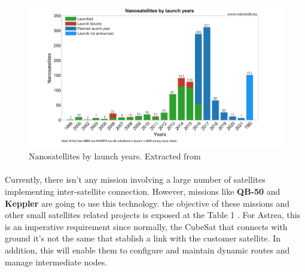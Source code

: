 \documentclass[12pt]{scrartcl}
\begin{document}
\begin{figure}[h!]
\centering
\includegraphics[scale=0.47]{images/launches.png}
\caption{Nanosatellites by launch years. Extracted from \cite{nanosats}}
\label{launches}
\end{figure}


\paragraph{}
Currently, there isn't any mission involving a large number of satellites implementing inter-satellite connection. However, missions like \textbf{QB-50} and \textbf{Keppler} are going to use this technology. the objective of these missions and other small satellites related projects is exposed at the Table 1
. For Astrea, this is an imperative requirement since normally, the CubeSat that connects with ground it’s not the same that stablish a link with the customer satellite. In addition, this will enable them to configure and maintain dynamic routes and manage intermediate nodes.
\end{document}
